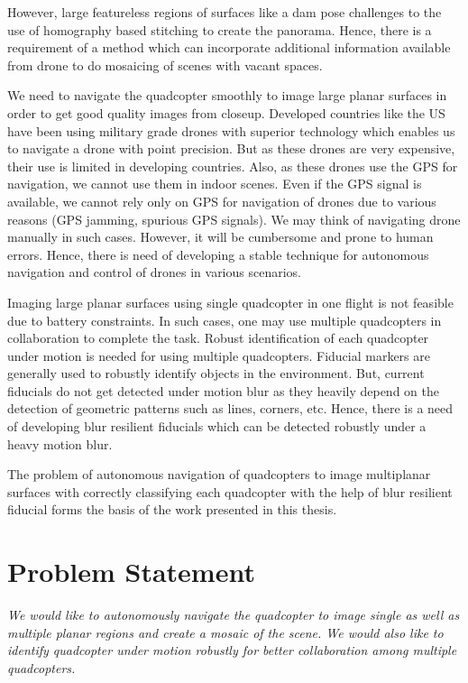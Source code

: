 However, large featureless regions of surfaces like a dam pose challenges to
the use of homography based stitching to create the panorama. Hence, there is a
requirement of a method which can incorporate additional information available from drone to do
mosaicing of scenes with vacant spaces. 

We need to navigate the quadcopter smoothly to image large planar surfaces in
order to get good quality images from closeup. Developed countries like the US
have been using military grade drones with superior technology which enables us to
navigate a drone with point precision. But as these drones are very expensive,
their use is limited in developing countries. Also, as these drones use the GPS
for navigation, we cannot use them in indoor scenes. Even if the GPS signal is
available, we cannot rely only on GPS for navigation of drones due to various
reasons (GPS jamming, spurious GPS signals). We may think of navigating drone
manually in such cases. However, it will be cumbersome and prone to human errors.
Hence, there is need of developing a stable technique for autonomous navigation
and control of drones in various scenarios.

Imaging large planar surfaces using single quadcopter in one flight is not
feasible due to battery constraints. In such cases, one may use multiple
quadcopters in collaboration to complete the task. Robust identification of
each quadcopter under motion is needed for using multiple quadcopters. Fiducial
markers are generally used to robustly identify objects in the environment. But,
current fiducials do not get detected under motion blur as they heavily depend on the
detection of geometric patterns such as lines, corners, etc. Hence, there is a
need of developing blur resilient fiducials which can be detected robustly under
a heavy motion blur.

The problem of autonomous navigation of quadcopters to image multiplanar
surfaces with correctly classifying each quadcopter with the help of blur
resilient fiducial forms the basis of the work presented in this thesis.\\

\section{Problem Statement}
\textit{We would like to autonomously navigate the quadcopter to image
single as well as multiple planar regions and create a mosaic of the 
scene. We would also like to identify quadcopter under motion robustly for
better collaboration among multiple quadcopters.} 

